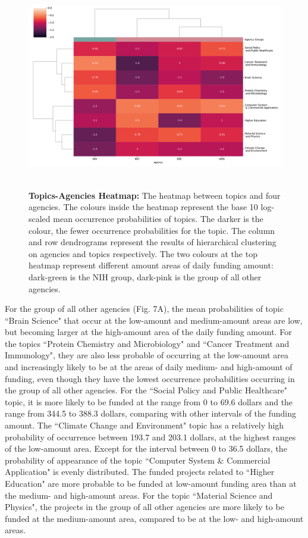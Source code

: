 \begin{figure}[H]
    \centering
    \includegraphics[width = 16cm, height = 9cm]{./img/heatmap_agency_topics.pdf}
    \caption[Heatmap between topic and agencies]{\textbf{Topics-Agencies Heatmap:} The heatmap between topics and four agencies. The colours inside the heatmap represent the base 10 log-scaled mean occurrence probabilities of topics. The darker is the colour, the fewer occurrence probabilities for the topic. The column and row dendrograms represent the results of hierarchical clustering on agencies and topics respectively. The two colours at the top heatmap represent different amount areas of daily funding amount: dark-green is the NIH group, dark-pink is the group of all other agencies.}
\end{figure}

For the group of all other agencies (Fig. 7A), the mean probabilities of topic ``Brain Science" that occur at the low-amount and medium-amount areas are low, but becoming larger at the high-amount area of the daily funding amount. For the topics ``Protein Chemistry and Microbiology" and ``Cancer Treatment and Immunology", they are also less probable of occurring at the low-amount area and increasingly likely to be at the areas of daily medium- and high-amount of funding, even though they have the lowest occurrence probabilities occurring in the group of all other agencies. For the ``Social Policy and Public Healthcare" topic, it is more likely to be funded at the range from 0 to 69.6 dollars and the range from 344.5 to 388.3 dollars, comparing with other intervals of the funding amount. The ``Climate Change and Environment" topic has a relatively high probability of occurrence between 193.7 and 203.1 dollars, at the highest ranges of the low-amount area. Except for the interval between 0 to 36.5 dollars, the probability of appearance of the topic ``Computer System \& Commercial Application" is evenly distributed. The funded projects related to ``Higher Education" are more probable to be funded at low-amount funding area than at the medium- and high-amount areas. For the topic ``Material Science and Physics", the projects in the group of all other agencies are more likely to be funded at the medium-amount area, compared to be at the low- and high-amount areas.


